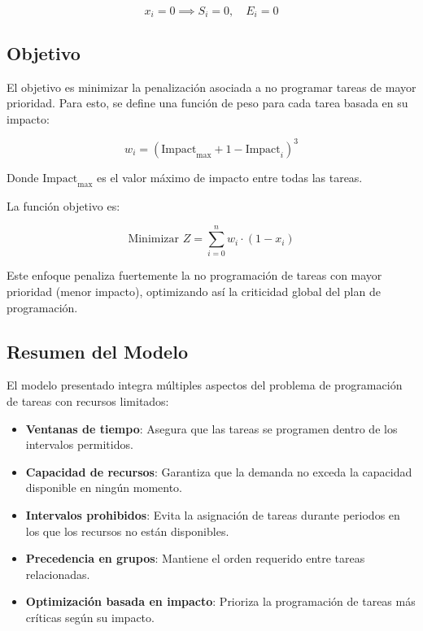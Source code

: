 \documentclass{article}
\begin{document}
\[
x_i = 0 \implies S_i = 0, \quad E_i = 0
\]

\vspace{0.5cm}

\subsection*{Objetivo}

El objetivo es minimizar la penalización asociada a no programar tareas de mayor prioridad. Para esto, se define una función de peso para cada tarea basada en su impacto:

\[
w_i = (\text{Impact}_{\text{max}} + 1 - \text{Impact}_i)^3
\]

Donde \( \text{Impact}_{\text{max}} \) es el valor máximo de impacto entre todas las tareas.

La función objetivo es:

\[
\text{Minimizar } Z = \sum_{i=0}^{n} w_i \cdot (1 - x_i)
\]

Este enfoque penaliza fuertemente la no programación de tareas con mayor prioridad (menor impacto), optimizando así la criticidad global del plan de programación.

\vspace{0.5cm}

\subsection*{Resumen del Modelo}

El modelo presentado integra múltiples aspectos del problema de programación de tareas con recursos limitados:

\begin{itemize}
    \item \textbf{Ventanas de tiempo}: Asegura que las tareas se programen dentro de los intervalos permitidos.
    \item \textbf{Capacidad de recursos}: Garantiza que la demanda no exceda la capacidad disponible en ningún momento.
    \item \textbf{Intervalos prohibidos}: Evita la asignación de tareas durante periodos en los que los recursos no están disponibles.
    \item \textbf{Precedencia en grupos}: Mantiene el orden requerido entre tareas relacionadas.
    \item \textbf{Optimización basada en impacto}: Prioriza la programación de tareas más críticas según su impacto.
\end{itemize}
\end{document}
